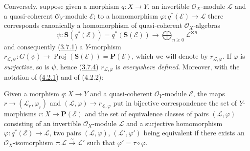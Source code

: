 \begin{env}[4.2.2]
\label{II.4.2.2}
Conversely, suppose given a morphism $q:X\to Y$, an invertible
$\mathcal{O}_X$-module $\mathcal{L}$ and a quasi-coherent
$\mathcal{O}_Y$-module $\mathcal{E}$; to a homomorphism
$\varphi:q^*(\mathcal{E})\to\mathcal{L}$ there corresponds canonically a
homomorphism of quasi-coherent $\mathcal{O}_X$-algebras
\[
  \psi:\mathbf{S}(q^*(\mathcal{E}))=q^*(\mathbf{S}(\mathcal{E}))
  \longrightarrow\bigoplus_{n\geq0}\mathcal{L}^{\otimes n}
\]
and consequently (\hyperref[II.3.7.1]{3.7.1}) a $Y$-morphism
$r_{\mathcal{L},\psi}:G(\psi)\to
\operatorname{Proj}(\mathbf{S}(\mathcal{E}))=\mathbf{P}(\mathcal{E})$, which
we will denote by $r_{\mathcal{L},\varphi}$. If $\varphi$ is \emph{surjective}, so
is $\psi$, hence (\hyperref[II.3.7.4]{3.7.4})
$r_{\mathcal{L},\varphi}$ is \emph{everywhere defined}. Moreover, with the notation of
(\hyperref[II.4.2.1]{4.2.1}) and of (4.2.2):
\end{env}

\begin{proposition}[4.2.3]
\label{II.4.2.3}
Given a morphism $q:X\to Y$ and a quasi-coherent $\mathcal{O}_Y$-module
$\mathcal{E}$, the maps
$r\to(\mathcal{L}_r,\varphi_r)$ and
$(\mathcal{L},\varphi)\to r_{\mathcal{L},\varphi}$ put in
bijective correspondence the set of $Y$-morphisms
$r:X\to\mathbf{P}(\mathcal{E})$ and the set of equivalence classes of
pairs $(\mathcal{L},\varphi)$ consisting of an invertible $\mathcal{O}_X$-module
$\mathcal{L}$ and a surjective homomorphism
$\varphi:q^*(\mathcal{E})\to\mathcal{L}$, two pairs
$(\mathcal{L},\varphi)$, $(\mathcal{L}',\varphi')$ being equivalent if there
exists an $\mathcal{O}_X$-isomorphism
$\tau:\mathcal{L}\xrightarrow{\sim}\mathcal{L}'$ such that
$\varphi'=\tau\circ\varphi$.
\end{proposition}

